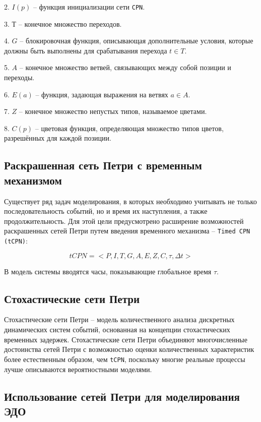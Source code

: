 2. $I(p)$ -- функция инициализации сети \texttt{CPN}.

3. $Т$ -- конечное множество переходов.

4. $G$ -- блокировочная функция, описывающая дополнительные условия, которые должны быть выполнены для срабатывания перехода $t \in T$.

5. $A$ -- конечное множество ветвей, связывающих между собой позиции и переходы.

6. $E(a)$ -- функция, задающая выражения на ветвях $a \in A$.

7. $Z$ -- конечное множество непустых типов, называемое цветами.

8. $C(p)$ -- цветовая функция, определяющая множество типов цветов, разрешённых для каждой позиции.

\subsection{Раскрашенная сеть Петри с временным механизмом}

Существует ряд задач моделирования, в которых необходимо учитывать не только последовательность событий, но и время их наступления, а также продолжительность. Для этой цели предусмотрено расширение возможностей раскрашенных сетей Петри\cite{kotov-petri} путем введения временного механизма -- \texttt{Timed CPN (tCPN)}:

\begin{equation}
	tCPN = <P, I, T, G, A, E, Z, C, \tau, \varDelta t>
\end{equation}

В модель системы вводятся часы, показывающие глобальное время $\tau$.

\subsection{Стохастические сети Петри}

Стохастические сети Петри -- модель количественного анализа дискретных динамических систем событий, основанная на концепции стохастических временных задержек\cite{spn}. Стохастические сети Петри объединяют многочисленные достоинства сетей Петри с возможностью оценки количественных характеристик более естественным образом, чем \texttt{tCPN}, поскольку многие реальные процессы лучше описываются вероятностными моделями.

\subsection{Использование сетей Петри для моделирования ЭДО}

